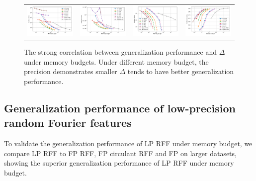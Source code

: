 \begin{figure}
	\centering
	\begin{tabular}{c c c c}
		\includegraphics[width=0.24\linewidth]{figures/regression_delta_vs_mem.pdf} &
		\includegraphics[width=0.24\linewidth]{figures/regression_l2_vs_mem.pdf} &
		\includegraphics[width=0.24\linewidth]{figures/classification_delta_vs_mem.pdf} &
		\includegraphics[width=0.24\linewidth]{figures/classification_acc_vs_mem.pdf} 
	\end{tabular}
	\caption{The strong correlation between generalization performance and $\Delta$ under memory budgets. Under different memory budget, the precision demonstrates smaller $\Delta$ tends to have better generalization performance.}
	\label{fig:generalizatio_col}
\end{figure}


\subsection{Generalization performance of low-precision random Fourier features}
To validate the generalization performance of LP RFF under memory budget, we compare LP RFF to FP RFF, FP circulant RFF and FP \Nystrom on larger datasets, showing the superior generalization performance of LP RFF under memory budget. 


